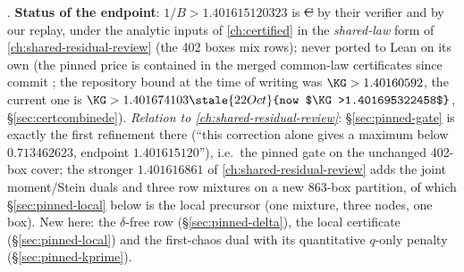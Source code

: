 . \textbf{Status of the endpoint}: $1/B>1.401615120323$ is \st{C} by their verifier and by our replay, under the analytic inputs of \autoref{ch:certified}
in the \emph{shared-law} form of \autoref{ch:shared-residual-review} (the 402 boxes mix rows); never ported to Lean on its own (the pinned price is contained in the merged common-law certificates since commit ; the repository bound at the time of writing was $\KG>1.40160592$, the current one is $\KG>1.401674103\stale{22 Oct}{now $\KG>1.401695322458$}$, \S\ref{sec:certcombinede}).
\emph{Relation to \autoref{ch:shared-residual-review}}: \S\ref{sec:pinned-gate} is exactly the first refinement there (``this correction alone gives a maximum below $0.713462623$,
endpoint $1.401615120$''), i.e.\ the pinned gate on the unchanged 402-box cover; the stronger $1.401616861$ of \autoref{ch:shared-residual-review} adds the joint moment/Stein duals and
three row mixtures on a new 863-box partition, of which \S\ref{sec:pinned-local} below is the local precursor (one mixture, three nodes, one box). New here: the $\delta$-free row
(\S\ref{sec:pinned-delta}), the local certificate (\S\ref{sec:pinned-local}) and the first-chaos dual with its quantitative $q$-only penalty (\S\ref{sec:pinned-kprime}).


